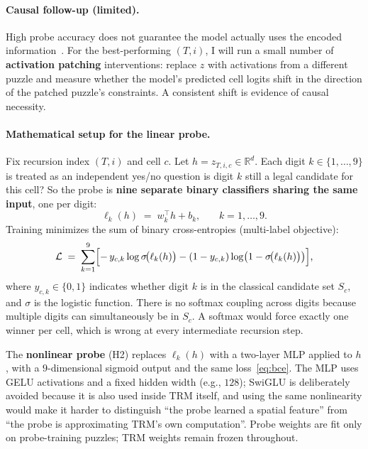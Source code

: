 \documentclass{article}
\begin{document}
\paragraph{Causal follow-up (limited).}  High probe accuracy does not guarantee the model actually uses the encoded information~\cite{belinkov2022probing, meng2022locating}.  For the best-performing $(T,i)$, I will run a small number of \textbf{activation patching} interventions: replace $z$ with activations from a different puzzle and measure whether the model's predicted cell logits shift in the direction of the patched puzzle's constraints.  A consistent shift is evidence of causal necessity.

\paragraph{Mathematical setup for the linear probe.}  Fix recursion index $(T,i)$ and cell $c$.  Let $h = z_{T,i,c} \in \mathbb{R}^{d}$.  Each digit $k \in \{1,\ldots,9\}$ is treated as an independent yes/no question is digit $k$ still a legal candidate for this cell? So the probe is \textbf{nine separate binary classifiers sharing the same input}, one per digit:
\begin{equation}
\label{eq:probe-logits}
\ell_{k}(h) \;=\; w_{k}^{\top} h + b_{k}\text{,} \qquad k = 1,\ldots,9\text{.}
\end{equation}
Training minimizes the sum of binary cross-entropies (multi-label objective):
\begin{equation}
\label{eq:bce}
\mathcal{L} \;=\; \sum_{k=1}^{9} \Bigl[ -\, y_{c,k} \log \sigma\!\bigl(\ell_{k}(h)\bigr) - (1 - y_{c,k}) \log \bigl(1 - \sigma\!\bigl(\ell_{k}(h)\bigr)\bigr) \Bigr]\text{,}
\end{equation}
where $y_{c,k} \in \{0,1\}$ indicates whether digit $k$ is in the classical candidate set $S_c$, and $\sigma$ is the logistic function.  There is no softmax coupling across digits because multiple digits can simultaneously be in $S_c$.  A softmax would force exactly one winner per cell, which is wrong at every intermediate recursion step.

\noindent The \textbf{nonlinear probe} (H2) replaces $\ell_k(h)$ with a two-layer MLP applied to $h$, with a $9$-dimensional sigmoid output and the same loss~\eqref{eq:bce}.  The MLP uses GELU activations and a fixed hidden width (e.g., $128$); SwiGLU is deliberately avoided because it is also used inside TRM itself, and using the same nonlinearity would make it harder to distinguish ``the probe learned a spatial feature'' from ``the probe is approximating TRM's own computation''.  Probe weights are fit only on probe-training puzzles; TRM weights remain frozen throughout.
\end{document}
